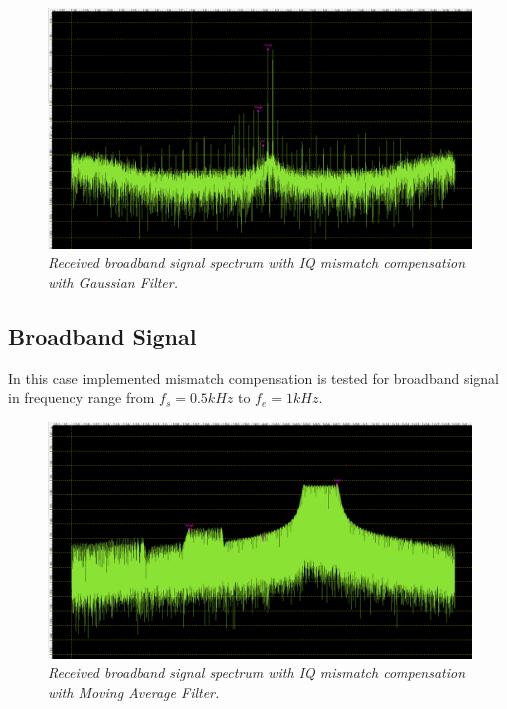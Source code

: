 \documentclass[en,printmode]{mgr}
\begin{document}
   		\begin{figure}[!htb]
    		\centering
   			\includegraphics[width=\textwidth]{plots/my_multi_gauss.png}
   		 	\caption{\textit{Received broadband signal spectrum with IQ mismatch compensation with
   		 	Gaussian Filter.}}
   		\end{figure}		
		\subsection*{Broadband Signal}
		In this case implemented mismatch compensation is tested for
		broadband signal in frequency range from $f_s=0.5kHz$ to $f_e=1kHz$.
		\begin{figure}[!htb]
    		\centering
   			\includegraphics[width=\textwidth]{plots/my_band_mav.png}
   		 	\caption{\textit{Received broadband signal spectrum with IQ mismatch compensation with
   		 	Moving Average Filter.}}
   		\end{figure}
   		
\end{document}
